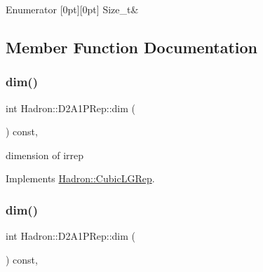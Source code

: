 \begin{DoxyEnumFields}{Enumerator}
[0pt][0pt]{}\mbox{\label{structHadron_1_1D2A1PRep_a97271733e4e1034a4dbfdf3f6c264113abfaaee73d648de55bbbaa0cba987a266}} 
Size\+\_\+t&\\
\hline

\end{DoxyEnumFields}


\subsection{Member Function Documentation}
\mbox{\label{structHadron_1_1D2A1PRep_a662b1c07136e38264b71c20d97f232ce}} 
\subsubsection{\texorpdfstring{dim()}{dim()}\hspace{0.1cm}{\footnotesize\ttfamily [1/3]}}
{\footnotesize\ttfamily int Hadron\+::\+D2\+A1\+P\+Rep\+::dim (\begin{DoxyParamCaption}{ }\end{DoxyParamCaption}) const\hspace{0.3cm}{\ttfamily [inline]}, {\ttfamily [virtual]}}

dimension of irrep 

Implements \mbox{\hyperlink{structHadron_1_1CubicLGRep_a3acbaea26503ed64f20df693a48e4cdd}{Hadron\+::\+Cubic\+L\+G\+Rep}}.

\mbox{\label{structHadron_1_1D2A1PRep_a662b1c07136e38264b71c20d97f232ce}} 
\subsubsection{\texorpdfstring{dim()}{dim()}\hspace{0.1cm}{\footnotesize\ttfamily [2/3]}}
{\footnotesize\ttfamily int Hadron\+::\+D2\+A1\+P\+Rep\+::dim (\begin{DoxyParamCaption}{ }\end{DoxyParamCaption}) const\hspace{0.3cm}{\ttfamily [inline]}, {\ttfamily [virtual]}}

